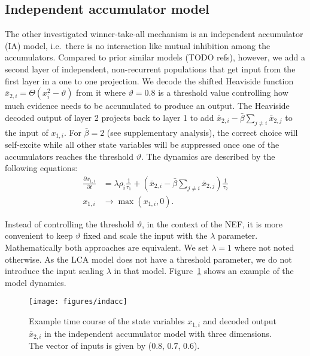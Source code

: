 \documentclass[10pt,letterpaper]{article}
\begin{document}
\subsection{Independent accumulator model}
The other investigated winner-take-all mechanism is an independent accumulator 
(IA) model, i.e.~there is no interaction like mutual inhibition among the 
accumulators. Compared to prior similar models (TODO refs), however, we add 
a second layer of independent, non-recurrent populations that get input from the 
first layer in a one to one projection. We decode the shifted Heaviside function 
$\bar{x}_{2,i} = \Theta(x^2_i - \vartheta)$ from it where $\vartheta = 0.8$ is 
a threshold value controlling how much evidence needs to be accumulated to 
produce an output.
The Heaviside decoded output of layer 2 projects back to layer 1 to add 
$\bar{x}_{2,i} - \bar{\beta} \sum_{j \neq i} \bar{x}_{2,j}$ to the input of $x_{1,i}$.
For $\bar{\beta} = 2$ (see supplementary analysis), the correct choice will self-excite while all other state variables will be 
suppressed once one of the accumulators reaches the threshold $\vartheta$.  The 
dynamics are described by the following equations:
\begin{equation}
    \begin{split}
        \frac{{\partial x}_{1,i}}{\partial t} &= \lambda \rho_i \frac{1}{\tau_1} + \left( 
            \bar{x}_{2,i} - \bar{\beta} \sum_{j \neq i} \bar{x}_{2,j} \right) \frac{1}{\tau_2} \\
        x_{1,i} &\rightarrow \max(x_{1,i}, 0) .
    \end{split}
\end{equation}

Instead of controlling the threshold $\vartheta$, in the context of the NEF, it 
is more convenient to keep $\vartheta$ fixed and scale the input with the 
$\lambda$ parameter. Mathematically both approaches are equivalent. We set 
$\lambda = 1$ where not noted otherwise. As the LCA model does not have 
a threshold parameter, we do not introduce the input scaling $\lambda$ in that 
model.  Figure~\ref{fig:indacc} shows an example of the model dynamics.
\begin{figure}
    \centering
    \texttt{[image: figures/indacc]}
    \caption{Example time course of the state variables $x_{1,i}$ and decoded 
        output $\bar{x}_{2,i}$ in the independent accumulator model with three 
        dimensions. The vector of inputs is given by (0.8, 0.7, 0.6).
    }\label{fig:indacc}
\end{figure}
\end{document}
